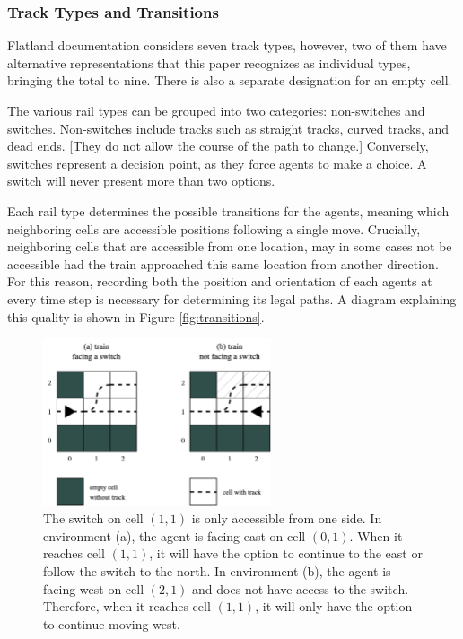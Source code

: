 \documentclass[11pt]{article}
\begin{document}
\subsubsection{Track Types and Transitions}
\label{sec:Track}
Flatland documentation considers seven track types, however, two of them have alternative representations that this paper recognizes as individual types, bringing the total to nine.  There is also a separate designation for an empty cell.

The various rail types can be grouped into two categories: non-switches and switches.  Non-switches include tracks such as straight tracks, curved tracks, and dead ends.  [They do not allow the course of the path to change.]  Conversely, switches represent a decision point, as they force agents to make a choice.  A switch will never present more than two options.

Each rail type determines the possible transitions for the agents, meaning which neighboring cells are accessible positions following a single move.  Crucially, neighboring cells that are accessible from one location, may in some cases not be accessible had the train approached this same location from another direction.  For this reason, recording both the position and orientation of each agents at every time step is necessary for determining its legal paths.  A diagram explaining this quality is shown in Figure \ref{fig:transitions}.

\label{fig:transitions}
\begin{figure}[t]
\centering
\includegraphics[width=0.60\textwidth]{transitions}
\caption{The switch on cell $(1,1)$ is only accessible from one side.  In environment (a), the agent is facing east on cell $(0,1)$.  When it reaches cell $(1,1)$, it will have the option to continue to the east or follow the switch to the north.  In environment (b), the agent is facing west on cell $(2,1)$ and does not have access to the switch.  Therefore, when it reaches cell $(1,1)$, it will only have the option to continue moving west.}
\end{figure}
\end{document}
